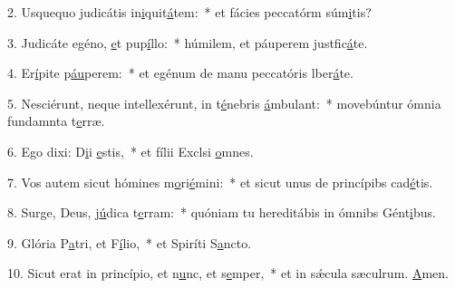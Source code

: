 2. Usquequo judicátis in\uline{i}quit\uline{á}tem:~* et fácies peccatórm súm\uline{i}tis?\par 
3. Judicáte egéno, \uline{e}t pup\uline{í}llo:~* húmilem, et páuperem justfic\uline{á}te.\par 
4. Er\uline{í}pite p\uline{áu}perem:~* et egénum de manu peccatóris lber\uline{á}te.\par 
5. Nesciérunt, neque intellexérunt, in t\uline{é}nebris \uline{á}mbulant:~* movebúntur ómnia fundamnta t\uline{e}rræ.\par 
6. Ego dixi: D\uline{i}i \uline{e}stis,~* et fílii Exclsi \uline{o}mnes.\par 
7. Vos autem sicut hómines m\uline{o}ri\uline{é}mini:~* et sicut unus de princípibs cad\uline{é}tis.\par 
8. Surge, Deus, j\uline{ú}dica t\uline{e}rram:~* quóniam tu hereditábis in ómnibs Gént\uline{i}bus.\par 
9. Glória P\uline{a}tri, et F\uline{í}lio,~* et Spiríti S\uline{a}ncto.\par 
10. Sicut erat in princípio, et n\uline{u}nc, et s\uline{e}mper,~* et in sǽcula sæculrum. \uline{A}men.\par 
